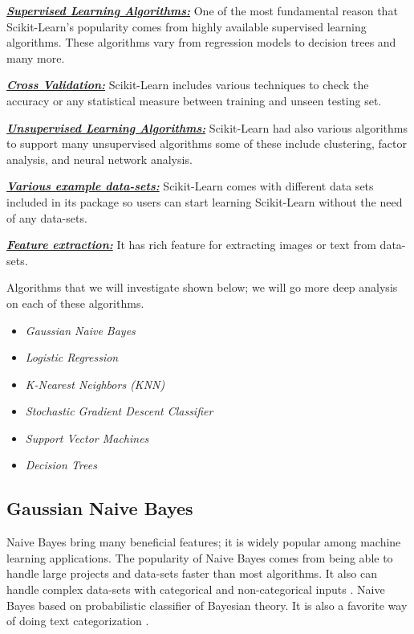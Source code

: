 \documentclass[sigconf]{acmart}
\begin{document}
\par \textbf{\textit{\underline{Supervised Learning Algorithms:}}} One of the most fundamental reason that Scikit-Learn's popularity comes from highly available supervised learning algorithms. These algorithms vary from regression models to decision trees and many more\cite{www-analyticvidhya}. 
\par \textbf{\textit{\underline{Cross Validation:}}} Scikit-Learn includes various techniqu\-es to check the accuracy or any statistical measure between training and unseen testing set\cite{www-analyticvidhya}. 
\par \textbf{\textit{\underline{Unsupervised Learning Algorithms:}}} Scikit-Learn had al\-so various algorithms to support many unsupervised algorithms some of these include clustering, factor analysis, and neural network analysis\cite{www-analyticvidhya}. 
\par \textbf{\textit{\underline{Various example data-sets:}}} Scikit-Learn comes with different data sets included in its package so users can start learning Scikit-Learn without the need of any data-sets\cite{www-analyticvidhya}. 
\par \textbf{\textit{\underline{Feature extraction:}}} It has rich feature for extracting images or text from data-sets\cite{www-analyticvidhya}.


\par Algorithms that we will investigate shown below; we will go more deep analysis on each of these algorithms. 

\begin{itemize}
    \item \textit{Gaussian Naive Bayes}
    \item \textit{Logistic Regression}
    \item \textit{K-Nearest Neighbors (KNN)}
    \item \textit{Stochastic Gradient Descent Classifier}
    \item \textit{Support Vector Machines}
    \item \textit{Decision Trees} 
\end{itemize}

\subsection{Gaussian Naive Bayes}
Naive Bayes bring many beneficial features; it is widely popular among machine learning applications\cite{tapan-kumar}. The popularity of Naive Bayes comes from being able to handle large projects and data-sets faster than most algorithms\cite{tapan-kumar}. It also can handle complex data-sets with categorical and non-categorical inputs \cite{tapan-kumar}. Naive Bayes based on probabilistic classifier of Bayesian theory. It is also a favorite way of doing text categorization \cite{www-wikipedia-naivebayes}. 
\end{document}
